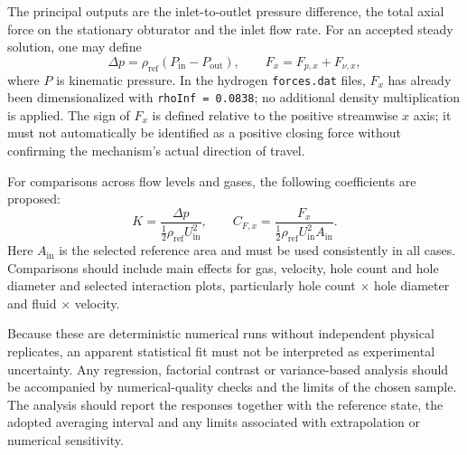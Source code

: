The principal outputs are the inlet-to-outlet pressure difference, the total axial force on the stationary obturator and the inlet flow rate. For an accepted steady solution, one may define
\begin{equation}
    \Delta p=\rho_{\mathrm{ref}}\left(P_{\mathrm{in}}-P_{\mathrm{out}}\right),
    \qquad
    F_x=F_{p,x}+F_{\nu,x},
    \label{eq:doe_responses}
\end{equation}
where $P$ is kinematic pressure. In the hydrogen \texttt{forces.dat} files, $F_x$ has already been dimensionalized with \texttt{rhoInf = 0.0838}; no additional density multiplication is applied. The sign of $F_x$ is defined relative to the positive streamwise $x$ axis; it must not automatically be identified as a positive closing force without confirming the mechanism's actual direction of travel.

For comparisons across flow levels and gases, the following coefficients are proposed:
\begin{equation}
    K=\frac{\Delta p}{\tfrac12\rho_{\mathrm{ref}}U_{\mathrm{in}}^2},
    \qquad
    C_{F,x}=\frac{F_x}{\tfrac12\rho_{\mathrm{ref}}U_{\mathrm{in}}^2 A_{\mathrm{in}}}.
    \label{eq:response_coefficients}
\end{equation}
Here $A_{\mathrm{in}}$ is the selected reference area and must be used consistently in all cases. Comparisons should include main effects for gas, velocity, hole count and hole diameter and selected interaction plots, particularly hole count $\times$ hole diameter and fluid $\times$ velocity.

Because these are deterministic numerical runs without independent physical replicates, an apparent statistical fit must not be interpreted as experimental uncertainty. Any regression, factorial contrast or variance-based analysis should be accompanied by numerical-quality checks and the limits of the chosen sample. The analysis should report the responses together with the reference state, the adopted averaging interval and any limits associated with extrapolation or numerical sensitivity.
